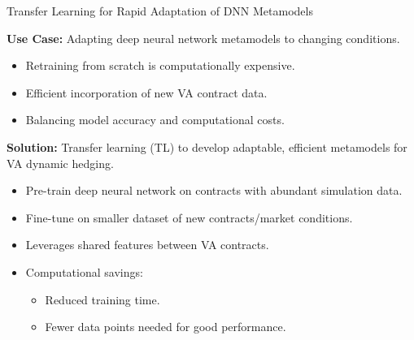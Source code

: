 \documentclass[9pt,handout]{beamer}
\begin{document}
\begin{frame}{Transfer Learning for Rapid Adaptation of DNN Metamodels}

    \textbf{Use Case:} Adapting deep neural network metamodels to changing conditions.
    \begin{itemize}
        \item   Retraining from scratch is computationally expensive.
        \item   Efficient incorporation of new VA contract data.
        \item   Balancing model accuracy and computational costs.
    \end{itemize}

    \vspace{10pt}

    \textbf{Solution:} Transfer learning (TL) to develop adaptable, efficient metamodels for VA dynamic hedging.

    \begin{itemize}
        \item   Pre-train deep neural network on contracts with abundant simulation data.
        \item   Fine-tune on smaller dataset of new contracts/market conditions.
        \item   Leverages shared features between VA contracts.
        \item   Computational savings:
            \begin{itemize}
                \item   Reduced training time.
                \item   Fewer data points needed for good performance.
            \end{itemize}
    \end{itemize}


\end{frame}
\end{document}
